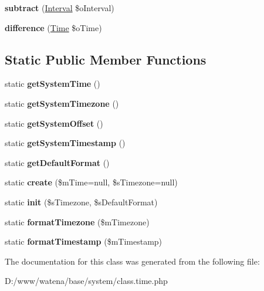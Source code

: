 \begin{DoxyCompactItemize}
\item 
\hypertarget{class_time_a9a3a21004bc5e0e34e6bbce2710917b1}{{\bfseries subtract} (\hyperlink{class_interval}{Interval} \$o\-Interval)}\label{class_time_a9a3a21004bc5e0e34e6bbce2710917b1}

\item 
\hypertarget{class_time_a263367bfd7f7eff6061b3725f034bdf2}{{\bfseries difference} (\hyperlink{class_time}{Time} \$o\-Time)}\label{class_time_a263367bfd7f7eff6061b3725f034bdf2}

\end{DoxyCompactItemize}
\subsection*{Static Public Member Functions}
\begin{DoxyCompactItemize}
\item 
\hypertarget{class_time_affc012773c95feca8ee54eb200e68fa9}{static {\bfseries get\-System\-Time} ()}\label{class_time_affc012773c95feca8ee54eb200e68fa9}

\item 
\hypertarget{class_time_a5d8ffe9695c8fe672e102cf78a6b887c}{static {\bfseries get\-System\-Timezone} ()}\label{class_time_a5d8ffe9695c8fe672e102cf78a6b887c}

\item 
\hypertarget{class_time_a31362d696fd96bf40701b2032be30ea4}{static {\bfseries get\-System\-Offset} ()}\label{class_time_a31362d696fd96bf40701b2032be30ea4}

\item 
\hypertarget{class_time_ade649c8b231d9b2925f7aecbd3a3b6d2}{static {\bfseries get\-System\-Timestamp} ()}\label{class_time_ade649c8b231d9b2925f7aecbd3a3b6d2}

\item 
\hypertarget{class_time_a92179c4901c55ef8d68c8bd3d3e8d343}{static {\bfseries get\-Default\-Format} ()}\label{class_time_a92179c4901c55ef8d68c8bd3d3e8d343}

\item 
\hypertarget{class_time_abb2363c6aa170ccd7564d4e19bba7fcb}{static {\bfseries create} (\$m\-Time=null, \$s\-Timezone=null)}\label{class_time_abb2363c6aa170ccd7564d4e19bba7fcb}

\item 
\hypertarget{class_time_adde1b9fb7ec8cbe3955dd4c00b4520df}{static {\bfseries init} (\$s\-Timezone, \$s\-Default\-Format)}\label{class_time_adde1b9fb7ec8cbe3955dd4c00b4520df}

\item 
\hypertarget{class_time_a67022b56f74f6989c26a26de956f8abe}{static {\bfseries format\-Timezone} (\$m\-Timezone)}\label{class_time_a67022b56f74f6989c26a26de956f8abe}

\item 
\hypertarget{class_time_a4cd32d2384c9c7f784e12903793ca6b4}{static {\bfseries format\-Timestamp} (\$m\-Timestamp)}\label{class_time_a4cd32d2384c9c7f784e12903793ca6b4}

\end{DoxyCompactItemize}


The documentation for this class was generated from the following file\-:\begin{DoxyCompactItemize}
\item 
D\-:/www/watena/base/system/class.\-time.\-php\end{DoxyCompactItemize}
